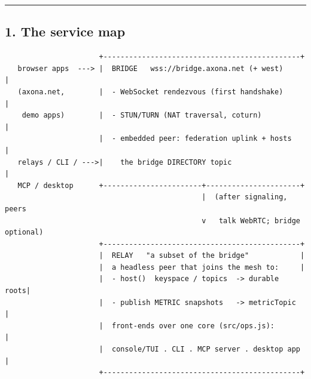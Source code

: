 \documentclass[
  nobib]{tufte-handout}
\begin{document}
\begin{center}\rule{0.5\linewidth}{0.5pt}\end{center}

\subsection{1. The service map}\label{the-service-map}

\begin{verbatim}
                      +----------------------------------------------+
   browser apps  ---> |  BRIDGE   wss://bridge.axona.net (+ west)     |
   (axona.net,        |  - WebSocket rendezvous (first handshake)     |
    demo apps)        |  - STUN/TURN (NAT traversal, coturn)          |
                      |  - embedded peer: federation uplink + hosts   |
   relays / CLI / --->|    the bridge DIRECTORY topic                 |
   MCP / desktop      +-----------------------+----------------------+
                                              |  (after signaling, peers
                                              v   talk WebRTC; bridge optional)
                      +----------------------------------------------+
                      |  RELAY   "a subset of the bridge"            |
                      |  a headless peer that joins the mesh to:     |
                      |  - host()  keyspace / topics  -> durable roots|
                      |  - publish METRIC snapshots   -> metricTopic  |
                      |  front-ends over one core (src/ops.js):       |
                      |  console/TUI . CLI . MCP server . desktop app |
                      +----------------------------------------------+
\end{verbatim}
\end{document}
